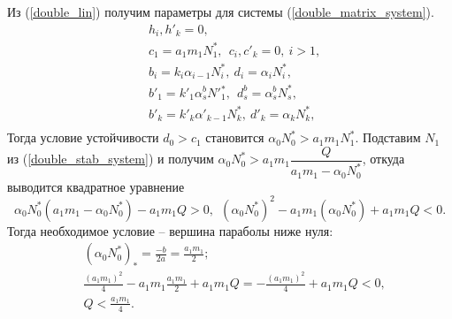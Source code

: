 Из (\ref{double_lin}) получим параметры для системы (\ref{double_matrix_system}).
\begin{equation}
    \begin{split}
        & h_i, h'_k = 0, \\
        & c_1 = a_1 m_1 N^*_1, ~~ c_i, c'_k = 0, ~ i>1,  \\
        & b_i = k_i \alpha_{i-1} N^*_{i}, ~ d_i = \alpha_i N^*_{i}, \\
        & b'_1 = k'_1 \alpha^b_s N'{}^*_1, ~~ d^b_s = \alpha^b_s N^*_s, \\
        & b'_k = k'_k \alpha'_{k-1} N^*_{k}, ~ d'_k = \alpha_k N^*_{k}, \\
    \end{split}
\end{equation}
Тогда условие устойчивости \(d_0 > c_1\) становится \(\alpha_0 N^*_{0} > a_1 m_1 N^*_1\). Подставим \(N_1\) из (\ref{double_stab_system}) и получим \(\alpha_0 N^*_{0} > a_1 m_1 \dfrac{Q}{ a_1 m_1 - \alpha_0 N_0^* }\), откуда выводится квадратное уравнение
\begin{equation*}
    \alpha_0 N^*_0 (a_1 m_1 - \alpha_0 N_0^*) - a_1 m_1 Q > 0, ~~ ( \alpha_0 N^*_0 )^2 - a_1 m_1 ( \alpha_0 N^*_0 ) + a_1 m_1 Q < 0.
\end{equation*}
Тогда необходимое условие -- вершина параболы ниже нуля:
\begin{equation*}
    \begin{split}
        & (\alpha_0 N^*_0)_* = \frac{-b}{2a} = \frac{a_1 m_1}{2}; \\
        & \frac{(a_1 m_1)^2}{4} - a_1 m_1 \frac{a_1 m_1}{2} + a_1 m_1 Q = -\frac{(a_1 m_1)^2}{4} + a_1 m_1 Q < 0, \\
        & Q < \frac{a_1 m_1}{4}.
    \end{split}
\end{equation*}